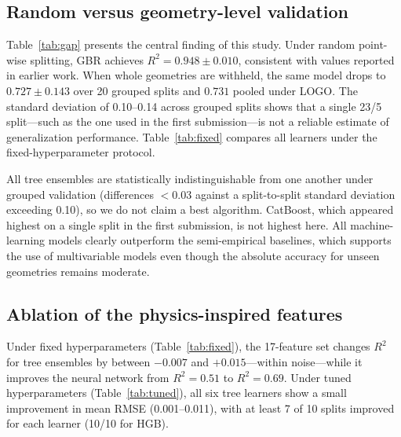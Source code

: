 \documentclass[12pt]{article}
\begin{document}
\subsection{Random versus geometry-level validation}
Table~\ref{tab:gap} presents the central finding of this study. Under random point-wise splitting, GBR achieves $R^2 = 0.948 \pm 0.010$, consistent with values reported in earlier work. When whole geometries are withheld, the same model drops to $0.727 \pm 0.143$ over 20 grouped splits and $0.731$ pooled under LOGO. The standard deviation of 0.10--0.14 across grouped splits shows that a single 23/5 split---such as the one used in the first submission---is not a reliable estimate of generalization performance. Table~\ref{tab:fixed} compares all learners under the fixed-hyperparameter protocol.

\begin{table}[!ht]\centering\caption{Accuracy under three validation schemes.}\label{tab:gap}\end{table}
\begin{table}[!ht]\centering\caption{20 repeated geometry-grouped 23/5 splits, fixed hyperparameters (mean$\pm$sd of $R^2$; mean RMSE).}\label{tab:fixed}\end{table}

All tree ensembles are statistically indistinguishable from one another under grouped validation (differences $<0.03$ against a split-to-split standard deviation exceeding 0.10), so we do not claim a best algorithm. CatBoost, which appeared highest on a single split in the first submission, is not highest here. All machine-learning models clearly outperform the semi-empirical baselines, which supports the use of multivariable models even though the absolute accuracy for unseen geometries remains moderate.

\subsection{Ablation of the physics-inspired features}
\label{sec:ablation}

Under fixed hyperparameters (Table~\ref{tab:fixed}), the 17-feature set changes $R^2$ for tree ensembles by between $-0.007$ and $+0.015$---within noise---while it improves the neural network from $R^2=0.51$ to $R^2=0.69$. Under tuned hyperparameters (Table~\ref{tab:tuned}), all six tree learners show a small improvement in mean RMSE (0.001--0.011), with at least 7 of 10 splits improved for each learner (10/10 for HGB).
\end{document}
